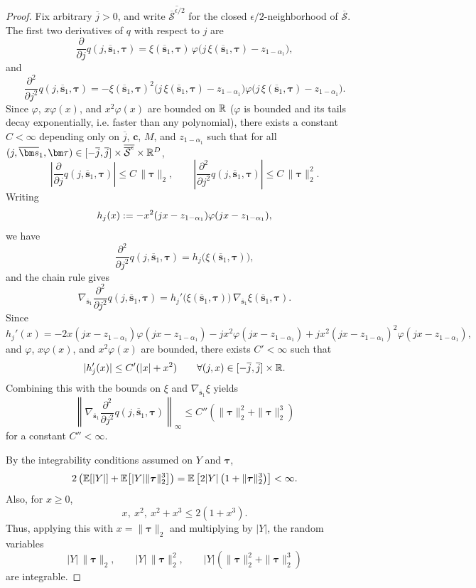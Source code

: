 \begin{proof}
  Fix arbitrary $\overline j>0$, and write $\overline{\overline{\mathcal{S}}^{\epsilon/2}}$ for the closed $\epsilon/2$-neighborhood of $\overline{\mathcal{S}}$.
  The first two derivatives of $q$ with respect to $j$ are
  \[
    \frac{\partial}{\partial j}q(j,\overline{\bm s}_1,\bm\tau)
    =
    \xi(\overline{\bm s}_1,\bm\tau)\,
    \varphi\!\big(j\,\xi(\overline{\bm s}_1,\bm\tau) - z_{1-\alpha_1}\big),
  \]
  and
  \[
    \frac{\partial^2}{\partial j^2}q(j,\overline{\bm s}_1,\bm\tau)
    =
    - \xi(\overline{\bm s}_1,\bm\tau)^2
    \big(j\,\xi(\overline{\bm s}_1,\bm\tau) - z_{1-\alpha_1}\big)
    \varphi\!\big(j\,\xi(\overline{\bm s}_1,\bm\tau) - z_{1-\alpha_1}\big).
  \]
  Since $\varphi$, $x\varphi(x)$, and $x^2\varphi(x)$ are bounded on $\mathbb{R}$ ($\varphi$ is bounded and its tails decay exponentially, i.e. faster than any polynomial), there exists a constant $C<\infty$ depending only on $\overline j$, $\bm c$, $M$, and $z_{1-\alpha_1}$ such that for all $(j,\overline{\bm s}_1,\bm\tau)\in[-\overline j,\overline j]\times \overline{\overline{\mathcal{S}}^{\epsilon}}\times\R^D$,
  \[
    \left|\frac{\partial}{\partial j}q(j,\overline{\bm s}_1,\bm\tau)\right|
    \le
    C\,\|\bm\tau\|_2,
    \qquad
    \left|\frac{\partial^2}{\partial j^2}q(j,\overline{\bm s}_1,\bm\tau)\right|
    \le
    C\,\|\bm\tau\|_2^2.
  \]
  Writing
  \[
    h_j(x):= - x^2(jx - z_{1-\alpha_1})\varphi(jx - z_{1-\alpha_1}),
  \]
  we have
  \[
    \frac{\partial^2}{\partial j^2}q(j,\overline{\bm s}_1,\bm\tau)
    =
    h_j\!\big(\xi(\overline{\bm s}_1,\bm\tau)\big),
  \]
  and the chain rule gives
  \[
    \nabla_{\overline{\bm s}_1}\frac{\partial^2}{\partial j^2}q(j,\overline{\bm s}_1,\bm\tau)
    =
    h_j'\!\big(\xi(\overline{\bm s}_1,\bm\tau)\big)\,
    \nabla_{\overline{\bm s}_1}\xi(\overline{\bm s}_1,\bm\tau).
  \]
  Since
  \[
    h_j'(x)
    =
    -2x(jx-z_{1-\alpha_1})\varphi(jx-z_{1-\alpha_1})
    -jx^2\varphi(jx-z_{1-\alpha_1})
    +jx^2(jx-z_{1-\alpha_1})^2\varphi(jx-z_{1-\alpha_1}),
  \]
  and $\varphi$, $x\varphi(x)$, and $x^2\varphi(x)$ are bounded, there exists $C'<\infty$ such that
  \[
    |h_j'(x)|\le C'(|x|+x^2)
    \qquad
    \forall (j,x)\in[-\overline j,\overline j]\times\mathbb{R}.
  \]
  Combining this with the bounds on $\xi$ and $\nabla_{\overline{\bm s}_1}\xi$ yields
  \[
    \left\|\nabla_{\overline{\bm s}_1}\frac{\partial^2}{\partial j^2}q(j,\overline{\bm s}_1,\bm\tau)\right\|_\infty
    \le
    C''\left(\|\bm\tau\|_2^2+\|\bm\tau\|_2^3\right)
  \]
  for a constant $C''<\infty$.

  By the integrability conditions assumed on $Y$ and $\bm{\tau}$,
  \[
    2\left(\mathbb{E}[|Y|]+\mathbb{E}\!\left[|Y|\|\boldsymbol{\tau}\|_2^3\right]\right)
    =
    \mathbb{E}\left[2|Y|\left(1+\|\boldsymbol{\tau}\|_2^3\right)\right]
    <
    \infty.
  \]
  Also, for \(x\ge 0\),
  \[
    x,\ x^2,\ x^2+x^3 \le 2(1+x^3).
  \]
  Thus, applying this with \(x=\|\boldsymbol{\tau}\|_2\) and multiplying by \(|Y|\), the random variables
  \[
    |Y|\,\|\boldsymbol{\tau}\|_2,
    \qquad
    |Y|\,\|\boldsymbol{\tau}\|_2^2,
    \qquad
    |Y|\left(\|\boldsymbol{\tau}\|_2^2+\|\boldsymbol{\tau}\|_2^3\right)
  \]
  are integrable.


\end{proof}
